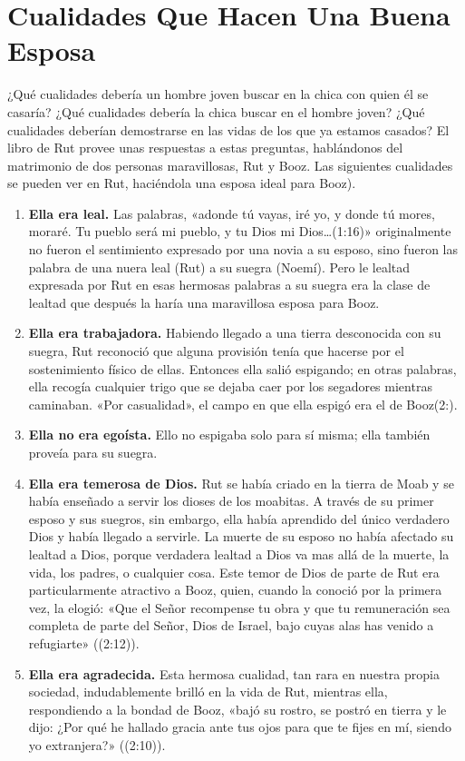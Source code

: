 \documentclass[12pt, twoside, openright]{book}
\begin{document}
\section{Cualidades Que Hacen Una Buena Esposa}
¿Qué cualidades debería un hombre joven buscar en la chica con quien él se casaría? ¿Qué cualidades debería la chica buscar en el hombre joven? ¿Qué cualidades deberían demostrarse en las vidas de los que ya estamos casados? El libro de Rut provee unas respuestas a estas preguntas, hablándonos del matrimonio de dos personas maravillosas, Rut y Booz. Las siguientes cualidades se pueden ver en Rut, haciéndola una esposa ideal para Booz). 
\begin{enumerate}
\item \textbf{Ella era leal.} Las palabras, «adonde tú vayas, iré yo, y donde tú mores, moraré. Tu pueblo será mi pueblo, y tu Dios mi Dios\ldots{}(1:16)» originalmente no fueron el sentimiento expresado por una novia a su esposo, sino fueron las palabra de una nuera leal (Rut) a su suegra (Noemí). Pero le lealtad expresada por Rut en esas hermosas palabras a su suegra era la clase de lealtad que después la haría una maravillosa esposa para Booz.
\item \textbf{Ella era trabajadora.} Habiendo llegado a una tierra desconocida con su suegra, Rut reconoció que alguna provisión tenía que hacerse por el sostenimiento físico de ellas. Entonces ella salió espigando; en otras palabras, ella recogía cualquier trigo que se dejaba caer por los segadores mientras caminaban. «Por casualidad», el campo en que ella espigó era el de Booz(2:).
\item \textbf{Ella no era egoísta.} Ello no espigaba solo para sí misma; ella también proveía para su suegra. 
\item \textbf{Ella era temerosa de Dios.} Rut se había criado en la tierra de Moab y se había enseñado a servir los dioses de los moabitas. A través de su primer esposo y sus suegros, sin embargo, ella había aprendido del único verdadero Dios y había llegado a servirle. La muerte de su esposo no había afectado su lealtad a Dios, porque verdadera lealtad a Dios va mas allá de la muerte, la vida, los padres, o cualquier cosa. Este temor de Dios de parte de Rut era particularmente atractivo a Booz, quien, cuando la conoció por la primera vez, la elogió: «Que el Señor recompense tu obra y que tu remuneración sea completa de parte del Señor, Dios de Israel, bajo cuyas alas has venido a refugiarte» ((2:12)). 
\item \textbf{Ella era agradecida.} Esta hermosa cualidad, tan rara en nuestra propia sociedad, indudablemente brilló en la vida de Rut, mientras ella, respondiendo a la bondad de Booz, «bajó su rostro, se postró en tierra y le dijo: ¿Por qué he hallado gracia ante tus ojos para que te fijes en mí, siendo yo extranjera?» ((2:10)).

\end{enumerate}
\end{document}
